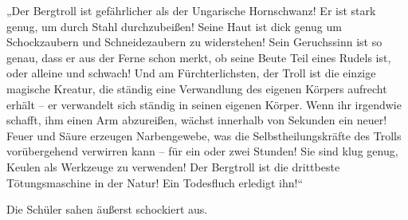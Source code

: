 „Der Bergtroll ist gefährlicher als der Ungarische Hornschwanz! Er ist stark genug, um durch Stahl durchzubeißen! Seine Haut ist dick genug um Schockzaubern und Schneidezaubern zu widerstehen! Sein Geruchssinn ist so genau, dass er aus der Ferne schon merkt, ob seine Beute Teil eines Rudels ist, oder alleine und schwach! Und am Fürchterlichsten, der Troll ist die einzige magische Kreatur, die ständig eine Verwandlung des eigenen Körpers aufrecht erhält – er verwandelt sich ständig in seinen eigenen Körper. Wenn ihr irgendwie schafft, ihm einen Arm abzureißen, wächst innerhalb von Sekunden ein neuer! Feuer und Säure erzeugen Narbengewebe, was die Selbstheilungskräfte des Trolls vorübergehend verwirren kann – für ein oder zwei Stunden! Sie sind klug genug, Keulen als Werkzeuge zu verwenden! Der Bergtroll ist die drittbeste Tötungsmaschine in der Natur! Ein Todesfluch erledigt ihn!“

Die Schüler sahen äußerst schockiert aus.


